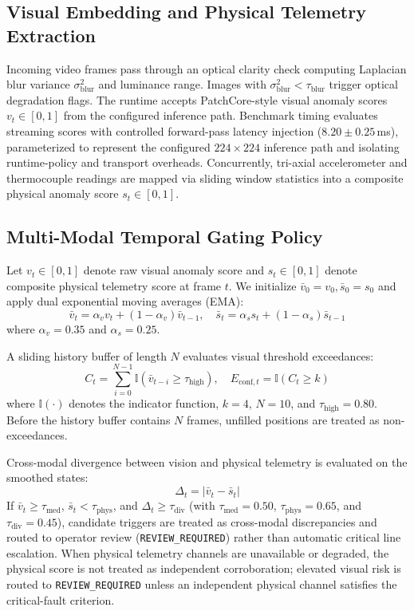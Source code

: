 \documentclass[conference]{IEEEtran}
\begin{document}
\subsection{Visual Embedding and Physical Telemetry Extraction}
Incoming video frames pass through an optical clarity check computing Laplacian blur variance $\sigma_{\mathrm{blur}}^2$ and luminance range. Images with $\sigma_{\mathrm{blur}}^2 < \tau_{\mathrm{blur}}$ trigger optical degradation flags. The runtime accepts PatchCore-style visual anomaly scores $v_t \in [0, 1]$ from the configured inference path. Benchmark timing evaluates streaming scores with controlled forward-pass latency injection ($8.20 \pm 0.25$\,ms), parameterized to represent the configured $224 \times 224$ inference path and isolating runtime-policy and transport overheads. Concurrently, tri-axial accelerometer and thermocouple readings are mapped via sliding window statistics into a composite physical anomaly score $s_t \in [0, 1]$.

\subsection{Multi-Modal Temporal Gating Policy}
Let $v_t \in [0, 1]$ denote raw visual anomaly score and $s_t \in [0, 1]$ denote composite physical telemetry score at frame $t$. We initialize $\bar{v}_0 = v_0, \bar{s}_0 = s_0$ and apply dual exponential moving averages (EMA):
\begin{equation}
\bar{v}_t = \alpha_v v_t + (1 - \alpha_v) \bar{v}_{t-1}, \quad \bar{s}_t = \alpha_s s_t + (1 - \alpha_s) \bar{s}_{t-1}
\end{equation}
where $\alpha_v = 0.35$ and $\alpha_s = 0.25$.

A sliding history buffer of length $N$ evaluates visual threshold exceedances:
\begin{equation}
C_t = \sum_{i=0}^{N-1} \mathbb{I}(\bar{v}_{t-i} \ge \tau_{\mathrm{high}}), \quad E_{\mathrm{conf}, t} = \mathbb{I}(C_t \ge k)
\end{equation}
where $\mathbb{I}(\cdot)$ denotes the indicator function, $k = 4$, $N = 10$, and $\tau_{\mathrm{high}} = 0.80$. Before the history buffer contains $N$ frames, unfilled positions are treated as non-exceedances.

Cross-modal divergence between vision and physical telemetry is evaluated on the smoothed states:
\begin{equation}
\Delta_t = |\bar{v}_t - \bar{s}_t|
\end{equation}
If $\bar{v}_t \ge \tau_{\mathrm{med}}$, $\bar{s}_t < \tau_{\mathrm{phys}}$, and $\Delta_t \ge \tau_{\mathrm{div}}$ (with $\tau_{\mathrm{med}} = 0.50$, $\tau_{\mathrm{phys}} = 0.65$, and $\tau_{\mathrm{div}} = 0.45$), candidate triggers are treated as cross-modal discrepancies and routed to operator review (\texttt{REVIEW\_REQUIRED}) rather than automatic critical line escalation. When physical telemetry channels are unavailable or degraded, the physical score is not treated as independent corroboration; elevated visual risk is routed to \texttt{REVIEW\_REQUIRED} unless an independent physical channel satisfies the critical-fault criterion.
\end{document}
